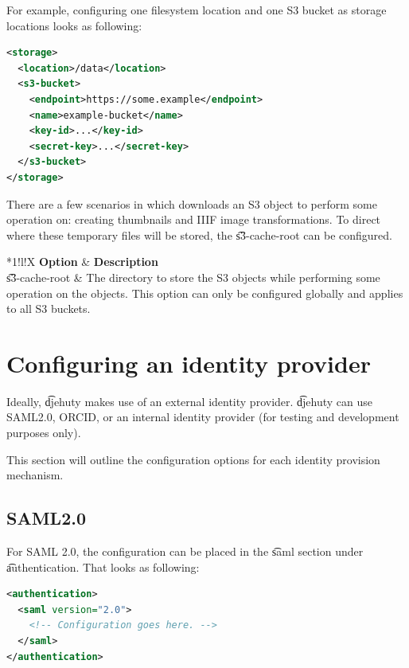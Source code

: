   For example, configuring one filesystem location and one S3 bucket
  as storage locations looks as following:

\begin{lstlisting}[language=xml]
<storage>
  <location>/data</location>
  <s3-bucket>
    <endpoint>https://some.example</endpoint>
    <name>example-bucket</name>
    <key-id>...</key-id>
    <secret-key>...</secret-key>
  </s3-bucket>
</storage>
\end{lstlisting}

  There are a few scenarios in which  downloads an S3 object
  to perform some operation on: creating thumbnails and IIIF image
  transformations.  To direct where these temporary files will be stored,
  the \t{s3-cache-root} can be configured.

\begin{tabularx}{\textwidth}{*{1}{!{\VRule[-1pt]}l}!{\VRule[-1pt]}X}
  \headrow
  \textbf{Option}             & \textbf{Description}\\
  \t{s3-cache-root}           & The directory to store the S3 objects
                                while performing some operation on the
                                objects.  This option can only be configured
                                globally and applies to all S3 buckets.
\end{tabularx}

\section{Configuring an identity provider}

  Ideally, \t{djehuty} makes use of an external identity provider.
  \t{djehuty} can use SAML2.0, ORCID, or an internal identity provider
  (for testing and development purposes only).

  This section will outline the configuration options for each
  identity provision mechanism.

\subsection {SAML2.0}

  For SAML 2.0, the configuration can be placed in the \t{saml}
  section under \t{authentication}.  That looks as following:

\begin{lstlisting}[language=xml]
<authentication>
  <saml version="2.0">
    <!-- Configuration goes here. -->
  </saml>
</authentication>
\end{lstlisting}

